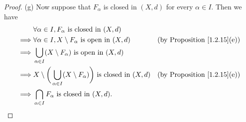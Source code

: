 \begin{proof}{(g)}
    Now suppose that \(F_\alpha\) is closed in \((X, d)\) for every \(\alpha \in I\).
    Then we have
    \begin{align*}
                 & \forall \alpha \in I, F_\alpha \text{ is closed in } (X, d)                                                                                  \\
        \implies & \forall \alpha \in I, X \setminus F_\alpha \text{ is open in } (X, d)                              & \text{(by Proposition \ref{1.2.15}(e))} \\
        \implies & \bigcup_{\alpha \in I} (X \setminus F_\alpha) \text{ is open in } (X, d)                                                                     \\
        \implies & X \setminus \bigg(\bigcup_{\alpha \in I} (X \setminus F_\alpha)\bigg) \text{ is closed in } (X, d) & \text{(by Proposition \ref{1.2.15}(e))} \\
        \implies & \bigcap_{\alpha \in I} F_\alpha \text{ is closed in } (X, d).
    \end{align*}
\end{proof}

